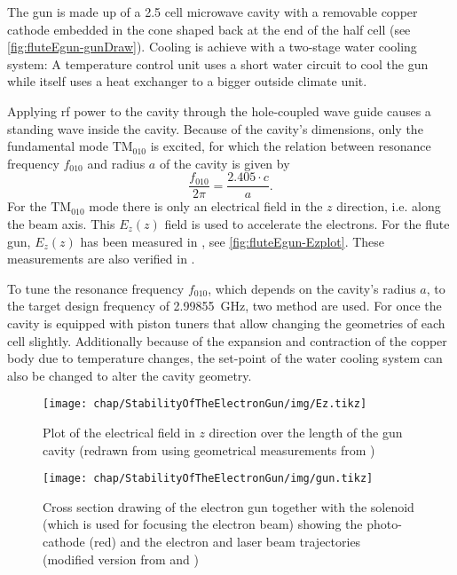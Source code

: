 The gun is made up of a 2.5 cell microwave cavity with a removable copper cathode embedded in the cone shaped back at the end of the half cell (see \autoref{fig:fluteEgun-gunDraw}). Cooling is achieve with a two-stage water cooling system: A temperature control unit uses a short water circuit to cool the gun while itself uses a heat exchanger to a bigger outside climate unit.

Applying \gls{rf} power to the cavity through the hole-coupled wave guide causes a standing wave inside the cavity. Because of the cavity's dimensions, only the fundamental mode $\text{TM}_{010}$ is excited, for which the relation between resonance frequency $f_{010}$ and radius $a$ of the cavity is given by
\begin{equation}
\frac{f_{010}}{2\pi}=\frac{2.405 \cdot c}{a}.
\end{equation}
For the $\text{TM}_{010}$ mode there is only an electrical field in the $z$ direction, i.e. along the beam axis. This $E_z(z)$ field is used to accelerate the electrons. For the \gls{flute} gun, $E_z(z)$ has been measured in \cite{Bossart:clic}, see \autoref{fig:fluteEgun-Ezplot}. These measurements are also verified in \cite{Schuh2014}.

To tune the resonance frequency $f_{010}$, which depends on the cavity's radius $a$, to the target design frequency of \SI{2.99855}{\GHz}, two method are used. For once the cavity is equipped with piston tuners that allow changing the geometries of each cell slightly. Additionally because of the expansion and contraction of the copper body due to temperature changes, the set-point of the water cooling system can also be changed to alter the cavity geometry.

\begin{figure}[tbh]
	\centering
	\texttt{[image: chap/StabilityOfTheElectronGun/img/Ez.tikz]}
	\caption{Plot of the electrical field in $z$ direction over the length of the gun cavity (redrawn from \cite{Bossart:clic} using geometrical measurements from \cite{Hoeninger2014})}
	\label{fig:fluteEgun-Ezplot}
\end{figure}

\begin{figure}[tbh]
	\centering
	\texttt{[image: chap/StabilityOfTheElectronGun/img/gun.tikz]}
	\caption{Cross section drawing of the electron gun together with the solenoid (which is used for focusing the electron beam) showing the photo-cathode (red) and the electron and laser beam trajectories
	\\(modified version from \cite{Bossart:clic} and \cite{Bossart:288412})}
	\label{fig:fluteEgun-gunDraw}
\end{figure}


